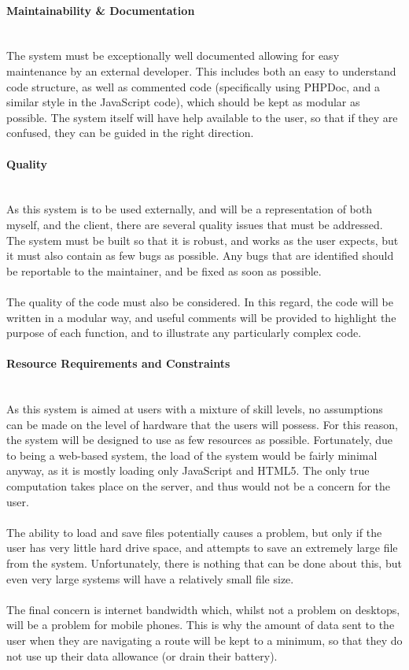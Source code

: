 \paragraph{Maintainability \& Documentation}\ \\
The system must be exceptionally well documented allowing for easy maintenance by an external developer. This includes both an easy to understand code structure, as well as commented code (specifically using PHPDoc, and a similar style in the JavaScript code), which should be kept as modular as possible.  The system itself will have help available to the user, so that if they are confused, they can be guided in the right direction.

\paragraph{Quality}\ \\
As this system is to be used externally, and will be a representation of both myself, and the client, there are several quality issues that must be addressed. The system must be built so that it is robust, and works as the user expects, but it must also contain as few bugs as possible. Any bugs that are identified should be reportable to the maintainer, and be fixed as soon as possible.\ \\
\ \\
The quality of the code must also be considered. In this regard, the code will be written in a modular way, and useful comments will be provided to highlight the purpose of each function, and to illustrate any particularly complex code.

\paragraph{Resource Requirements and Constraints}\ \\
As this system is aimed at users with a mixture of skill levels, no assumptions can be made on the level of hardware that the users will possess. For this reason, the system will be designed to use as few resources as possible. Fortunately, due to being a web-based system, the load of the system would be fairly minimal anyway, as it is mostly loading only JavaScript and HTML5. The only true computation takes place on the server, and thus would not be a concern for the user.\ \\
\ \\
The ability to load and save files potentially causes a problem, but only if the user has very little hard drive space, and attempts to save an extremely large file from the system. Unfortunately, there is nothing that can be done about this, but even very large systems will have a relatively small file size.\ \\
\ \\
The final concern is internet bandwidth which, whilst not a problem on desktops, will be a problem for mobile phones. This is why the amount of data sent to the user when they are navigating a route will be kept to a minimum, so that they do not use up their data allowance (or drain their battery).

